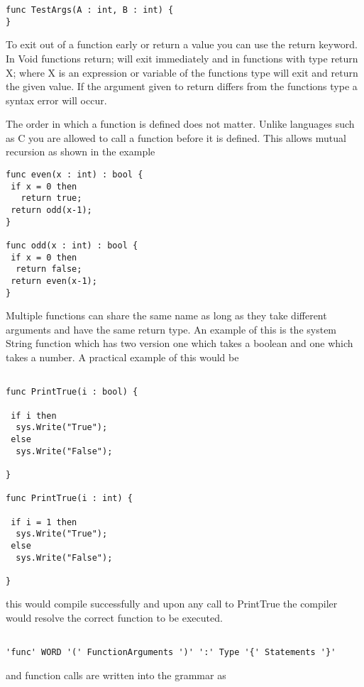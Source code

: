 \documentclass[]{final_report}
\begin{document}
\begin{verbatim}
func TestArgs(A : int, B : int) {
}
\end{verbatim}

To exit out of a function early or return a value you can use the return keyword. In Void functions return; will exit immediately and in functions with type return X; where X is an expression or variable of the functions type will exit and return the given value. If the argument given to return differs from the functions type a syntax error will occur.

The order in which a function is defined does not matter. Unlike languages such as C you are allowed to call a function before it is defined. This allows mutual recursion as shown in the example

\begin{verbatim}
func even(x : int) : bool {
 if x = 0 then 
   return true;
 return odd(x-1);
}

func odd(x : int) : bool {
 if x = 0 then 
  return false;
 return even(x-1);
}
\end{verbatim}

Multiple functions can share the same name as long as they take different arguments and have the same return type. An example of this is the system String function which has two version one which takes a boolean and one which takes a number. A practical example of this would be

\begin{verbatim}

func PrintTrue(i : bool) {

 if i then 
  sys.Write("True"); 
 else 
  sys.Write("False");

}

func PrintTrue(i : int) {

 if i = 1 then
  sys.Write("True");
 else
  sys.Write("False");

}

\end{verbatim}

this would compile successfully and upon any call to PrintTrue the compiler would resolve the correct function to be executed.


\begin{verbatim}

'func' WORD '(' FunctionArguments ')' ':' Type '{' Statements '}'

\end{verbatim}

and function calls are written into the grammar as
\end{document}
